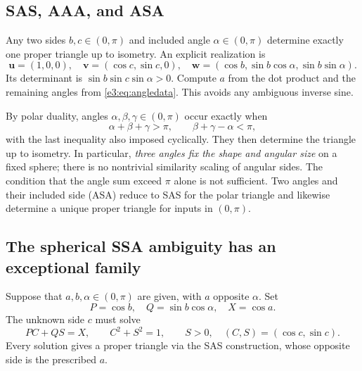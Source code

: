 \documentclass[11pt,letterpaper]{article}
\numberwithin{equation}{section}
\theoremstyle{definition}
\theoremstyle{remark}
\newcommand{\vv}[1]{\bm{#1}}
\begin{document}
\subsection{SAS, AAA, and ASA}

Any two sides $b,c\in(0,\pi)$ and included angle
$\alpha\in(0,\pi)$ determine exactly one proper triangle up to isometry.
An explicit realization is
\[
 \vv u=(1,0,0),\quad
 \vv v=(\cos c,\sin c,0),\quad
 \vv w=(\cos b,\sin b\cos\alpha,\sin b\sin\alpha).
\]
Its determinant is $\sin b\sin c\sin\alpha>0$. Compute $a$ from the dot
product and the remaining angles from \cref{e3:eq:angledata}. This avoids any
ambiguous inverse sine.

By polar duality, angles $\alpha,\beta,\gamma\in(0,\pi)$ occur exactly when
\begin{equation}\label{e3:eq:AAAcriterion}
 \alpha+\beta+\gamma>\pi,\qquad
 \beta+\gamma-\alpha<\pi,
\end{equation}
with the last inequality also imposed cyclically. They then determine the
triangle up to isometry. In particular, \emph{three angles fix the shape and
angular size} on a fixed sphere; there is no nontrivial similarity scaling of
angular sides. The condition that the angle sum exceed $\pi$ alone is not
sufficient. Two angles and their included side (ASA) reduce to SAS for the
polar triangle and likewise determine a unique proper triangle for inputs
in $(0,\pi)$.

\subsection{The spherical SSA ambiguity has an exceptional family}\label{e3:subsec:SSA}

Suppose that $a,b,\alpha\in(0,\pi)$ are given, with $a$ opposite
$\alpha$. Set
\[
 P=\cos b,\quad Q=\sin b\cos\alpha,\quad X=\cos a.
\]
The unknown side $c$ must solve
\begin{equation}\label{e3:eq:SSAlinecircle}
 P C+Q S=X,\qquad C^2+S^2=1,\qquad S>0,
 \quad (C,S)=(\cos c,\sin c).
\end{equation}
Every solution gives a proper triangle via the SAS construction, whose
opposite side is the prescribed $a$.
\end{document}
